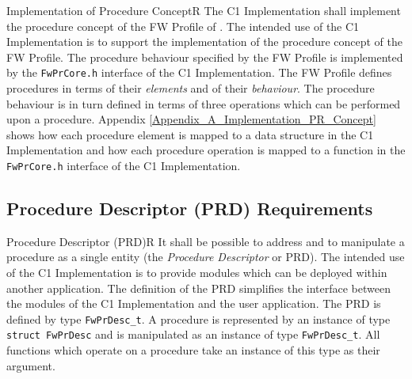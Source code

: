 \documentclass[a4paper,10pt]{article}
\newenvironment{fw_req}[6]
{\addtocounter{subsubsection}{1}
	\hspace{0.2cm}\textbf{FW-\arabic{section}.\arabic{subsection}.\arabic{subsubsection}/#2
	\hspace{0.8cm} #1}
	\vspace{-10pt}
\begin{longtable}{p{2.7cm}P{8.5cm}}
\hline
\textsc{Requirement} & #3 \\
\textsc{Justification} & #4 \\
\textsc{Implementation} & #5  \\ 
\textsc{Verification} & #6  \\
\hline
}
{\end{longtable}}
\begin{document}
\begin{fw_req}{Implementation of Procedure Concept}{R}
{The C1 Implementation shall implement the procedure concept of 
the FW Profile of \cite{ref:fwprofile}.}
{The intended use of the C1 Implementation is to support the 
implementation of the procedure concept of the FW Profile.}
{The procedure behaviour specified by the FW Profile is implemented by 
the \texttt{FwPrCore.h} interface of the C1 Implementation.} 
{The FW Profile defines procedures in terms of their \emph{elements} 
and of their \emph{behaviour}. 
The procedure behaviour is in turn defined in terms of three operations which can be performed 
upon a procedure. 
Appendix \ref{Appendix_A_Implementation_PR_Concept} shows how each procedure element is mapped to a data structure in the C1 Implementation and how each procedure operation is mapped to a 
function in the \texttt{FwPrCore.h} interface of the C1 Implementation.}
\end{fw_req}


\subsection{Procedure Descriptor (PRD) Requirements}\label{req:PRD}

\begin{fw_req}{Procedure Descriptor (PRD)}{R}
{It shall be possible to address and to manipulate a procedure as a 
single entity (the \emph{Procedure Descriptor} or PRD).}
{The intended use of the C1 Implementation is to provide modules which 
can be deployed within another application. 
The definition of the PRD simplifies the interface between the modules of the C1 Implementation 
and the user application.}
{The PRD is defined by type \texttt{FwPrDesc\_t}.} 
{A procedure is represented by an instance of type \texttt{struct FwPrDesc} 
and is manipulated as an instance of type \texttt{FwPrDesc\_t}. 
All functions which operate on a procedure take an instance of this type as their argument.}
\end{fw_req}
\end{document}

